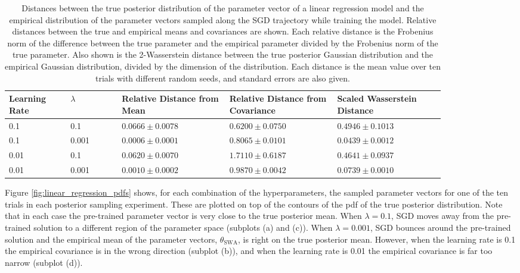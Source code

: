 \documentclass[msc,deptreport.inf]{infthesis} %
\begin{document}
\begin{table}[h!]
	\begin{center}
		\begin{tabular}{|| p{0.12\linewidth} p{0.1\linewidth} p{0.21\linewidth} p{0.21\linewidth} p{0.21\linewidth} ||} 
 			\hline
 			Learning Rate & $\lambda$ & Relative Distance from Mean & Relative Distance from Covariance & Scaled Wasserstein Distance \\ [0.5ex] 
 			\hline\hline
 			0.1 	&  0.1 	& $0.0666 \pm 0.0078$	& $0.6200 \pm 0.0750$	& $0.4946 \pm 0.1013$ \\ 
			\hline
 			0.1 	& 0.001	& $0.0006 \pm 0.0001$	& $0.8065 \pm 0.0101$ 	& $0.0439 \pm 0.0012$  \\
			\hline
			0.01	& 0.1 	& $0.0620 \pm 0.0070$	& $1.7110 \pm 0.6187$ 	& $0.4641 \pm 0.0937$ \\ 
			\hline
 			0.01	& 0.001 	& $0.0010 \pm 0.0002$ 	& $0.9870 \pm 0.0042$ 	& $0.0739 \pm 0.0010$  \\ [1ex] 
			\hline
		\end{tabular}
		\caption{Distances between the true posterior distribution of the parameter vector of a linear regression model and the empirical distribution of the parameter vectors sampled along the SGD trajectory while training the model. Relative distances between the true and empirical means and covariances are shown. Each relative distance is the Frobenius norm of the difference between the true parameter and the empirical parameter divided by the Frobenius norm of the true parameter. Also shown is the 2-Wasserstein distance between the true posterior Gaussian distribution and the empirical Gaussian distribution, divided by the dimension of the distribution. Each distance is the mean value over ten trials with different random seeds, and standard errors are also given.}
		\label{table:linear_regression_samples}
	\end{center}
\end{table}

Figure \ref{fig:linear_regression_pdfs} shows, for each combination of the hyperparameters, the sampled parameter vectors for one of the ten trials in each posterior sampling experiment. These are plotted on top of the contours of the pdf of the true posterior distribution. Note that in each case the pre-trained parameter vector is very close to the true posterior mean. When $\lambda = 0.1$, SGD moves away from the pre-trained solution to a different region of the parameter space (subplots (a) and (c)). When $\lambda = 0.001$, SGD bounces around the pre-trained solution and the empirical mean of the parameter vectors, $\theta_{\text{SWA}}$, is right on the true posterior mean. However, when the learning rate is 0.1 the empirical covariance is in the wrong direction (subplot (b)), and when the learning rate is 0.01 the empirical covariance is far too narrow (subplot (d)).
\end{document}

